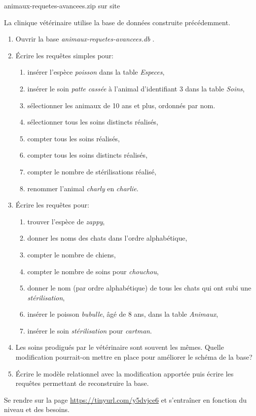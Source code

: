 \documentclass[a4paper,11pt]{article}
\begin{document}
\begin{Form}
\begin{commentprof}
animaux-requetes-avancees.zip sur site
\end{commentprof}
\begin{exo}
La clinique vétérinaire utilise la base de données construite précédemment.
\begin{enumerate}
\item Ouvrir la base \emph{animaux-requetes-avancees.db} .
\item Écrire les requêtes simples pour:
\begin{enumerate}
\item insérer l'espèce \emph{poisson} dans la table \emph{Especes},
\item insérer le soin \emph{patte cassée} à l'animal d'identifiant 3 dans la table \emph{Soins},
\item sélectionner les animaux de 10 ans et plus, ordonnés par nom.
\item sélectionner tous les soins distincts réalisés,
\item compter tous les soins réalisés,
\item compter tous les soins distincts réalisés,
\item compter le nombre de stérilisations réalisé,
\item renommer l'animal \emph{charly} en \emph{charlie}.
\end{enumerate}
\item Écrire les requêtes pour:
\begin{enumerate}
\item trouver l'espèce de \emph{zappy},
\item donner les noms des chats dans l'ordre alphabétique,
\item compter le nombre de chiens,
\item compter le nombre de soins pour \emph{chouchou},
\item donner le nom (par ordre alphabétique) de tous les chats qui ont subi une \emph{stérilisation},
\item insérer le poisson \emph{bubulle}, âgé de 8 ans, dans la table \emph{Animaux},
\item insérer le soin \emph{stérilisation} pour \emph{cartman}.
\end{enumerate}
\item Les soins prodigués par le vétérinaire sont souvent les mêmes. Quelle modification pourrait-on mettre en place pour améliorer le schéma de la base?
\item Écrire le modèle relationnel avec la modification apportée puis écrire les requêtes permettant de reconstruire la base.
\end{enumerate}
\end{exo}
\begin{exo}
Se rendre sur la page \url{https://tinyurl.com/y5dvjce6} et s'entraîner en fonction du niveau et des besoins.
\end{exo}
\end{Form}
\end{document}
